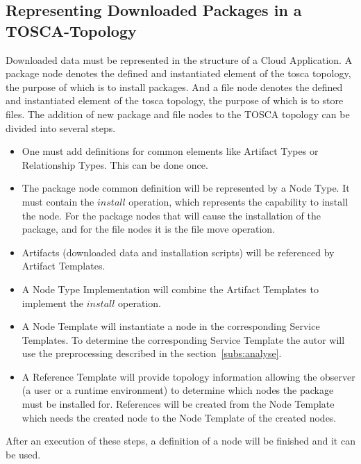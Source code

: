\subsection{Representing Downloaded Packages in a TOSCA-Topology} \label{subs:repres}
Downloaded data must be represented in the structure of a Cloud Application. 
A package node denotes the defined and instantiated element of the \gls{tosca} topology, the purpose of which is to install packages.
And a file node denotes the defined and instantiated element of the \gls{tosca} topology, the purpose of which is to store files.
The addition of new package and file nodes to the TOSCA topology can be divided into several steps.
\begin{itemize}
	\item One must add definitions for common elements like Artifact Types or Relationship Types. 
		This can be done once.
	\item The package node common definition will be represented by a Node Type. 
		It must contain the $install$ operation, which represents the capability to install the node.
		For the package nodes that will cause the installation of the package, and for the file nodes it is the file move operation.
	\item Artifacts (downloaded data and installation scripts) will be referenced by Artifact Templates.
	\item A Node Type Implementation will combine the Artifact Templates to implement the $install$ operation.
	\item A Node Template will instantiate a node in the corresponding Service Templates.
		To determine the corresponding Service Template the autor will use the preprocessing described in the section~\ref{subs:analyse}.
	\item A Reference Template will provide topology information allowing the observer (a user or a runtime environment) to determine which nodes the package must be installed for.
		References will be created from the Node Template which needs the created node to the Node Template of the created nodes.
\end{itemize}
After an execution of these steps, a definition of a node will be finished and it can be used.

